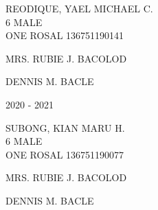 \documentclass{article}
\begin{document}
{{\begin{multicols}{2}
\begin{center}
\end{center} 
\vspace{4mm} 
\phantom{Name:} \hspace*{5em} REODIQUE, YAEL MICHAEL C. \\[2.5mm] %
\phantom{Age} \hspace*{8em} 6  \phantom{Sex} \hspace*{12em} MALE \\[2.5mm] %
\phantom{Grade} \hspace*{3em} ONE \phantom{Section} \hspace*{4em} ROSAL \phantom{LRN} \hspace*{4em} 136751190141 \\
\vspace*{25mm}
\begin{flushright}
MRS. RUBIE J. BACOLOD \hspace*{-1.5em}
\end{flushright}  
\vspace*{1.5mm}
\hspace*{3em} DENNIS M. BACLE
\end{multicols} 
\newpage
\begin{multicols}{2}
\phantom{u}
\columnbreak
\vspace*{-3mm}
\begin{center}
\phantom{school year:} \hspace*{6em} 2020 - 2021 
\end{center} 
\vspace{4mm} 
\phantom{Name:} \hspace*{5em} SUBONG, KIAN MARU H. \\[2.5mm] %
\phantom{Age} \hspace*{8em} 6  \phantom{Sex} \hspace*{12em} MALE \\[2.5mm] %
\phantom{Grade} \hspace*{3em} ONE \phantom{Section} \hspace*{4em} ROSAL \phantom{LRN} \hspace*{4em} 136751190077 \\
\vspace*{25mm}
\begin{flushright}
MRS. RUBIE J. BACOLOD \hspace*{-1.5em}
\end{flushright}  
\vspace*{1.5mm}
\hspace*{3em} DENNIS M. BACLE
\end{multicols} 
}}
\end{document}
